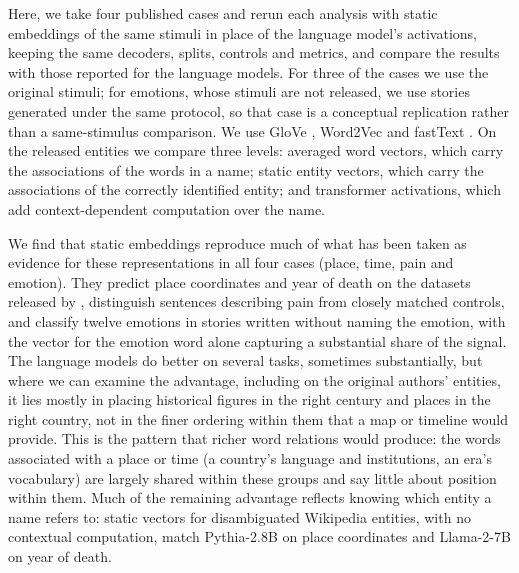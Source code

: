\documentclass[11pt]{article}
\begin{document}
Here, we take four published cases and rerun each analysis with static embeddings of the same stimuli in place of the language model's activations, keeping the same decoders, splits, controls and metrics, and compare the results with those reported for the language models. For three of the cases we use the original stimuli; for emotions, whose stimuli are not released, we use stories generated under the same protocol, so that case is a conceptual replication rather than a same-stimulus comparison. We use GloVe \citep{pennington2014glove}, Word2Vec \citep{mikolov2013efficient} and fastText \citep{bojanowski2017enriching}. On the released entities we compare three levels: averaged word vectors, which carry the associations of the words in a name; static entity vectors, which carry the associations of the correctly identified entity; and transformer activations, which add context-dependent computation over the name.

We find that static embeddings reproduce much of what has been taken as evidence for these representations in all four cases (place, time, pain and emotion). They predict place coordinates and year of death on the datasets released by \citet{gurnee2024language}, distinguish sentences describing pain from closely matched controls, and classify twelve emotions in stories written without naming the emotion, with the vector for the emotion word alone capturing a substantial share of the signal. The language models do better on several tasks, sometimes substantially, but where we can examine the advantage, including on the original authors' entities, it lies mostly in placing historical figures in the right century and places in the right country, not in the finer ordering within them that a map or timeline would provide. This is the pattern that richer word relations would produce: the words associated with a place or time (a country's language and institutions, an era's vocabulary) are largely shared within these groups and say little about position within them. Much of the remaining advantage reflects knowing which entity a name refers to: static vectors for disambiguated Wikipedia entities, with no contextual computation, match Pythia-2.8B on place coordinates and Llama-2-7B on year of death.
\end{document}
